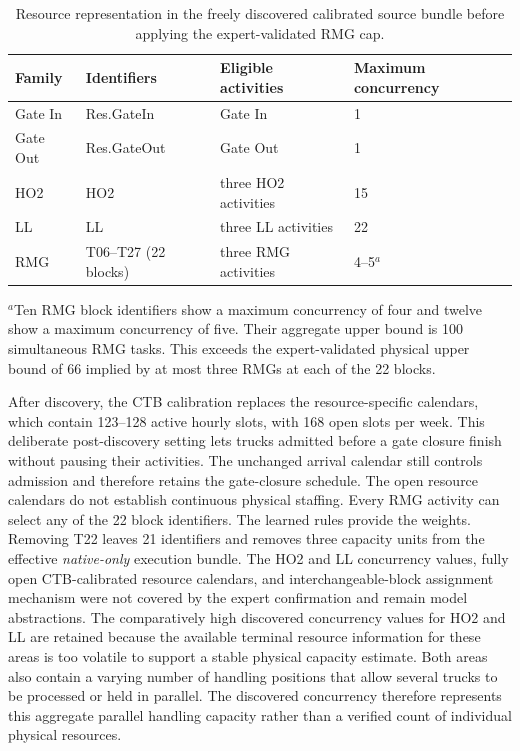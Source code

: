 \begin{table}[htbp]
\centering
\begin{tabular}{L{1.3cm}L{3.1cm}L{4.0cm}L{2.6cm}}
\toprule
\textbf{Family} & \textbf{Identifiers} & \textbf{Eligible activities} &
\textbf{Maximum concurrency} \\
\midrule
Gate In  & Res.GateIn  & Gate In & 1 \\
Gate Out & Res.GateOut & Gate Out & 1 \\
HO2      & HO2 & three HO2 activities & 15 \\
LL       & LL  & three LL activities  & 22 \\
RMG      & T06--T27 (22 blocks) & three RMG activities & 4--5$^{a}$ \\
\bottomrule
\end{tabular}
\caption{Resource representation in the freely discovered calibrated
source bundle before applying the expert-validated RMG cap.}
\label{tab:capacities_train80}
\smallskip
\parbox{0.94\textwidth}{\footnotesize $^{a}$Ten RMG block identifiers
show a maximum concurrency of four and twelve show a maximum concurrency of
five. Their aggregate upper bound is 100 simultaneous RMG tasks.
This exceeds the expert-validated physical upper bound of 66 implied by at
most three RMGs at each of the 22 blocks.}
\end{table}

After discovery, the CTB calibration replaces the resource-specific calendars,
which contain 123--128 active hourly slots, with 168 open slots per week. This
deliberate post-discovery setting lets trucks admitted before a gate closure
finish without pausing their activities. The unchanged arrival calendar still
controls admission and therefore retains the gate-closure schedule. The open
resource calendars do not establish continuous physical staffing. Every RMG
activity can select any of the 22
block identifiers. The learned rules provide the weights. Removing T22 leaves
21 identifiers and removes three capacity units from the effective
\textit{native-only} execution bundle.
The HO2 and LL concurrency values, fully open CTB-calibrated resource calendars, and
interchangeable-block assignment mechanism were not covered by the expert
confirmation and remain model abstractions. The comparatively high discovered
concurrency values for HO2 and LL are retained because the available terminal
resource information for these areas is too volatile to support a stable
physical capacity estimate. Both areas also contain a varying number of
handling positions that allow several trucks to be processed or
held in parallel. The discovered concurrency therefore represents this
aggregate parallel handling capacity rather than a verified count of individual physical resources.

